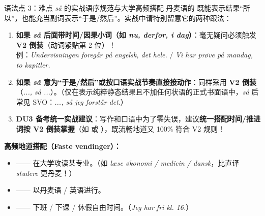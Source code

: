 \begin{grammatikbox}{语法点 3：难点  \textit{så} 的实战语序规范与大学高频搭配}
丹麦语的  既能表示结果“所以”，也能充当副词表示“于是/然后”。实战中请特别留意它的两种跟法：
\begin{enumerate}
  \item \textbf{如果 \textit{så} 后面带时间/因果小词（如 \textit{nu, derfor, i dag}）}：毫无疑问必须触发 \textbf{V2 倒装}（动词紧贴第 2 位）！\\
    例：\textit{Undervisningen foregår på engelsk,  det hele.} / \textit{Vi har prøve på mandag,  to kapitler.}
  \item \textbf{如果 \textit{så} 意为“于是/然后”或按口语实战节奏直接接动作}：同样采用 \textbf{V2 倒装}（\textit{..., så ...}）。（仅在表示纯粹静态结果且不加任何状语的正式书面语中，\textit{så} 后常见 SVO：\textit{..., så jeg forstår det}.）
  \item \textbf{DU3 备考统一实战建议}：写作和口语中为了零失误，建议\textbf{统一搭配时间/推进词按 V2 倒装掌握}（如  或 ），既流畅地道又 100\% 符合 V2 规则！
\end{enumerate}

\textbf{高频地道搭配（Faste vendinger）：}
\begin{itemize}
  \item {} —— 在大学攻读某专业。（如 \textit{læse økonomi / medicin / dansk}，比直译 \textit{studere} 更丹麦！）
  \item {} —— 以丹麦语 / 英语进行。
  \item {} —— 下班 / 下课 / 休假自由时间。（\textit{Jeg har fri kl. 16.}）
\end{itemize}
\end{grammatikbox}


